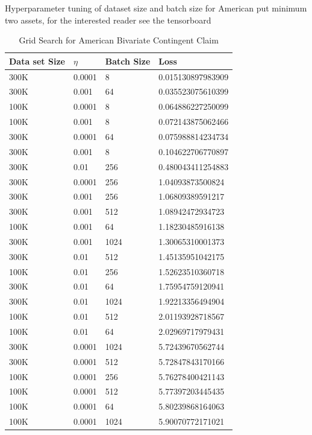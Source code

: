 \begin{table}[H]
\caption{Grid Search for American Bivariate Contingent Claim}{Hyperparameter tuning of dataset size and batch size for American put minimum two assets, for the interested reader see the tensorboard}
\label{tab:fullhyperAmerMin4}
\centering
\begin{tabular}{llll}
\toprule
\textbf{Data set Size} & \textbf{$\eta$} & \textbf{Batch Size} & \textbf{Loss} \\
\midrule
300K    & 0.0001 & 8     & 0.015130897983909 \\ 
300K    & 0.001  & 64    & 0.035523075610399 \\ 
100K    & 0.0001 & 8     & 0.064886227250099 \\ 
100K    & 0.001  & 8     & 0.072143875062466 \\ 
300K    & 0.0001 & 64    & 0.075988814234734 \\ 
300K    & 0.001  & 8     & 0.104622706770897 \\ 
300K    & 0.01   & 256   & 0.480043411254883 \\ 
300K    & 0.0001 & 256   & 1.04093873500824  \\ 
300K    & 0.001  & 256   & 1.06809389591217  \\ 
300K    & 0.001  & 512   & 1.08942472934723  \\ 
100K    & 0.001  & 64    & 1.18230485916138  \\ 
300K    & 0.001  & 1024  & 1.30065310001373  \\ 
300K    & 0.01   & 512   & 1.45135951042175  \\ 
100K    & 0.01   & 256   & 1.52623510360718  \\ 
300K    & 0.01   & 64    & 1.75954759120941  \\ 
300K    & 0.01   & 1024  & 1.92213356494904  \\ 
100K    & 0.01   & 512   & 2.01193928718567  \\ 
100K    & 0.01   & 64    & 2.02969717979431  \\ 
300K    & 0.0001 & 1024  & 5.72439670562744  \\ 
300K    & 0.0001 & 512   & 5.72847843170166  \\ 
100K    & 0.0001 & 256   & 5.76278400421143  \\ 
100K    & 0.0001 & 512   & 5.77397203445435  \\ 
100K    & 0.0001 & 64    & 5.80239868164063  \\ 
100K    & 0.0001 & 1024  & 5.90070772171021  \\ 

\end{tabular}
\end{table}

